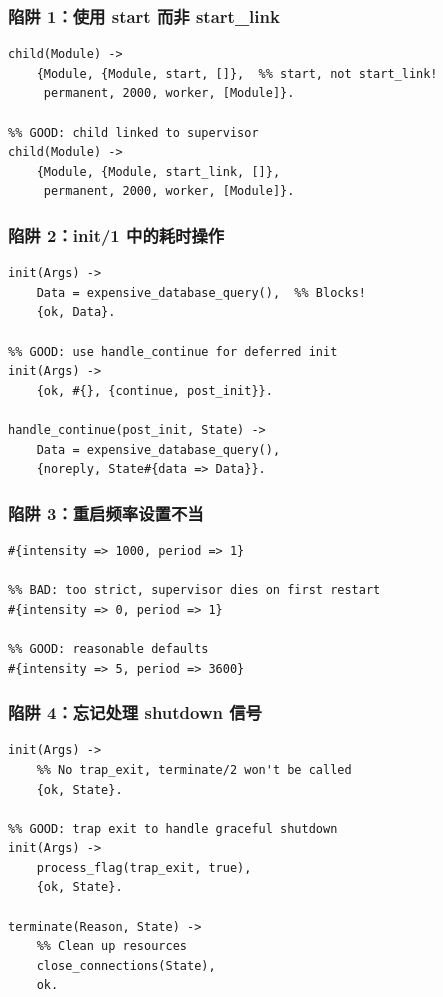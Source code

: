 \documentclass[a4paper,11pt]{article}
\begin{document}
\subsubsection{陷阱 1：使用 start 而非 start\_link}

\begin{lstlisting}[style=erlangstyle]
%% BAD: child not linked to supervisor
child(Module) ->
    {Module, {Module, start, []},  %% start, not start_link!
     permanent, 2000, worker, [Module]}.

%% GOOD: child linked to supervisor
child(Module) ->
    {Module, {Module, start_link, []},
     permanent, 2000, worker, [Module]}.
\end{lstlisting}

\subsubsection{陷阱 2：init/1 中的耗时操作}

\begin{lstlisting}[style=erlangstyle]
%% BAD: blocks supervisor startup
init(Args) ->
    Data = expensive_database_query(),  %% Blocks!
    {ok, Data}.

%% GOOD: use handle_continue for deferred init
init(Args) ->
    {ok, #{}, {continue, post_init}}.

handle_continue(post_init, State) ->
    Data = expensive_database_query(),
    {noreply, State#{data => Data}}.
\end{lstlisting}

\subsubsection{陷阱 3：重启频率设置不当}

\begin{lstlisting}[style=erlangstyle]
%% BAD: too permissive, may restart forever
#{intensity => 1000, period => 1}

%% BAD: too strict, supervisor dies on first restart
#{intensity => 0, period => 1}

%% GOOD: reasonable defaults
#{intensity => 5, period => 3600}
\end{lstlisting}

\subsubsection{陷阱 4：忘记处理 shutdown 信号}

\begin{lstlisting}[style=erlangstyle]
%% BAD: child ignores shutdown signal
init(Args) ->
    %% No trap_exit, terminate/2 won't be called
    {ok, State}.

%% GOOD: trap exit to handle graceful shutdown
init(Args) ->
    process_flag(trap_exit, true),
    {ok, State}.

terminate(Reason, State) ->
    %% Clean up resources
    close_connections(State),
    ok.
\end{lstlisting}
\end{document}

